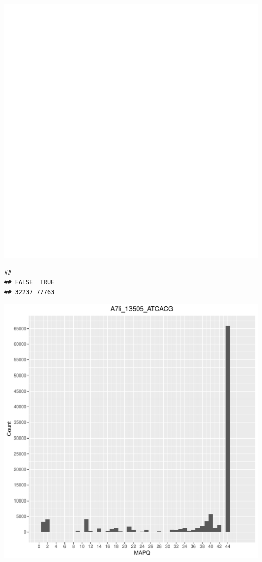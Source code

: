 \documentclass[12pt, a4paper]{article}\usepackage[]{graphicx}\usepackage[]{color}
\makeatletter
\def\maxwidth{ %
  \ifdim\Gin@nat@width>\linewidth
    \linewidth
  \else
    \Gin@nat@width
  \fi
}
\newenvironment{kframe}{%
 \def\at@end@of@kframe{}%
 \ifinner\ifhmode%
  \def\at@end@of@kframe{\end{minipage}}%
  \begin{minipage}{\columnwidth}%
 \fi\fi%
 \def\FrameCommand##1{\hskip\@totalleftmargin \hskip-\fboxsep
 \colorbox{shadecolor}{##1}\hskip-\fboxsep
     \hskip-\linewidth \hskip-\@totalleftmargin \hskip\columnwidth}%
 \MakeFramed {\advance\hsize-\width
   \@totalleftmargin\z@ \linewidth\hsize
   \@setminipage}}%
 {\par\unskip\endMakeFramed%
 \at@end@of@kframe}
\newenvironment{knitrout}{}{} %
\makeatother
\begin{document}
\begin{knitrout}
\includegraphics[width=\maxwidth]{figure/unnamed-chunk-3-2} 
\begin{kframe}\begin{verbatim}
## 
## FALSE  TRUE 
## 32237 77763
\end{verbatim}
\end{kframe}
\includegraphics[width=\maxwidth]{figure/unnamed-chunk-3-3} 


\end{knitrout}
\end{document}
